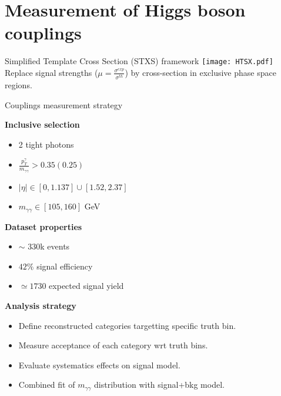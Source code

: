 \section{Measurement of Higgs boson couplings}
\frame{\tableofcontents[currentsection]}

\begin{frame}{Simplified Template Cross Section (STXS) framework}
  \centering
  \texttt{[image: HTSX.pdf]}\\
  Replace signal strengths ($\mu=\frac{\sigma^{exp}}{\sigma^{th}}$) by cross-section in exclusive phase space regions.
\end{frame}
\begin{frame}{Couplings measurement strategy}

  \begin{minipage}{0.49\linewidth}
  {\bf Inclusive selection }
  \begin{itemize}
  \item 2 tight photons
  \item $\frac{p_T^\gamma}{m_{\gamma\gamma}}>0.35 (0.25)$
  \item $|\eta|\in [0, 1.137]  \cup [1.52, 2.37]$
  \item $m_{\gamma\gamma} \in [105, 160]$ GeV
  \end{itemize}
  \end{minipage}
  \hfill
  \begin{minipage}{0.49\linewidth}
    {\bf Dataset properties}  

    \begin{itemize}
    \item $\sim$ 330k events
    \item $42\%$ signal efficiency
    \item $\simeq 1730$ expected signal yield
    \end{itemize}
  \end{minipage}
  \vfill
  {\bf Analysis strategy } 
  \begin{itemize}
  \item Define reconstructed categories targetting specific truth bin.
  \item Measure acceptance of each category wrt truth bins.
  \item Evaluate systematics effects on signal model.
  \item Combined fit of $m_{\gamma\gamma}$ distribution with signal+bkg model.
  \end{itemize}

\end{frame}

